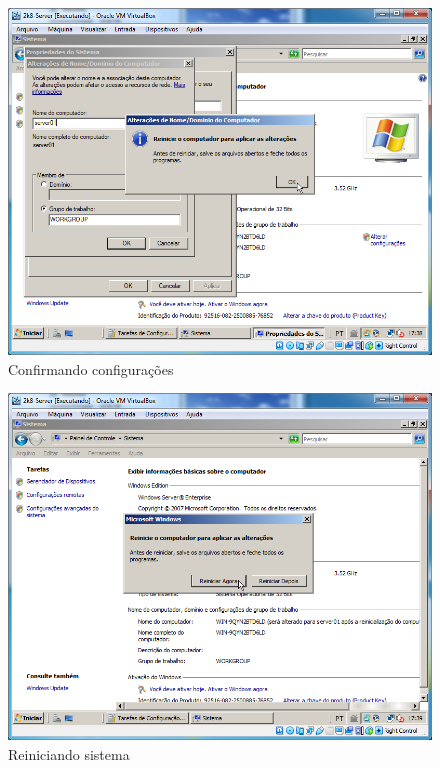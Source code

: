 \documentclass[10pt]{article}
\begin{document}
\begin{figure}[H]
    \centering
    \caption{Confirmando configurações}
    \label{fig:4226}
    \includegraphics[width=\linewidth]{images/configuracao_windows/windows_server/013.png}
\end{figure}
\begin{figure}[H]
    \centering
    \caption{Reiniciando sistema}
    \label{fig:4227}
    \includegraphics[width=\linewidth]{images/configuracao_windows/windows_server/015.png}
\end{figure}
\end{document}
